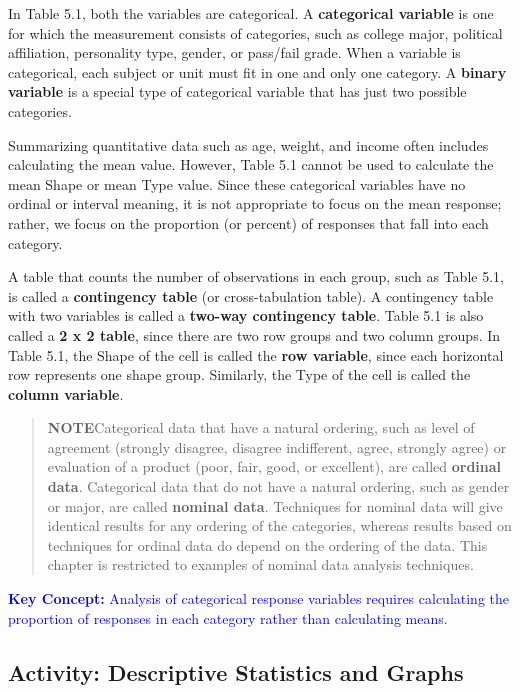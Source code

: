 \documentclass[
]{book}
\begin{document}
In Table 5.1, both the variables are categorical. A \textbf{categorical variable} is one for which the measurement consists of categories, such as college major, political affiliation, personality type, gender, or pass/fail grade. When a variable is categorical, each subject or unit must fit in one and only one category. A \textbf{binary variable} is a special type of categorical variable that has just two possible categories.

Summarizing quantitative data such as age, weight, and income often includes calculating the mean value.
However, Table 5.1 cannot be used to calculate the mean Shape or mean Type value. Since these categorical variables have no ordinal or interval meaning, it is not appropriate to focus on the mean response; rather, we focus on the proportion (or percent) of responses that fall into each category.

A table that counts the number of observations in each group, such as Table 5.1, is called a \textbf{contingency table} (or cross-tabulation table). A contingency table with two variables is called a \textbf{two-way contingency table}. Table 5.1 is also called a \textbf{2 x 2 table}, since there are two row groups and two column groups. In Table
5.1, the Shape of the cell is called the \textbf{row variable}, since each horizontal row represents one shape group.
Similarly, the Type of the cell is called the \textbf{column variable}.

\begin{quote}
\textbf{NOTE}Categorical data that have a natural ordering, such as level of agreement (strongly disagree, disagree indifferent, agree, strongly agree) or evaluation of a product (poor, fair, good, or excellent), are called \textbf{ordinal data}. Categorical data that do not have a natural ordering, such as gender or major, are called \textbf{nominal data}. Techniques for nominal data will give identical results for any ordering of the categories, whereas results based on techniques for ordinal data do depend on the ordering of the data. This chapter is restricted to examples of nominal data analysis techniques.
\end{quote}

\textbf{\textcolor{blue}{Key Concept:}}
\textcolor{blue}{Analysis of categorical response variables requires calculating the proportion of responses in each category rather than calculating means.}

\hypertarget{activity-descriptive-statistics-and-graphs}{%
\subsection*{Activity: Descriptive Statistics and Graphs}\label{activity-descriptive-statistics-and-graphs}}
\end{document}

